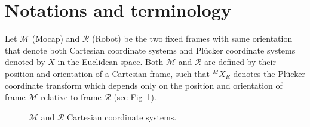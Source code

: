 \documentclass[a4paper, 12pt, oneside]{Thesis}  %
\begin{document}
\clearpage

\section{Notations and terminology}
Let $\mathcal{M}$ (Mocap) and $\mathcal{R}$ (Robot) be the two fixed frames with same orientation that denote both Cartesian coordinate systems and Pl\"ucker coordinate systems denoted by $X$ in the Euclidean space. Both $\mathcal{M}$ and $\mathcal{R}$ are defined by their position and orientation of a Cartesian frame, such that ${}^MX_R$ denotes the Pl\"ucker coordinate transform which depends only on the position and orientation of frame $\mathcal{M}$ relative to frame $\mathcal{R}$ (see Fig~\ref{fig:frames}).

\begin{figure}[ht]
	\caption{$\mathcal{M}$ and $\mathcal{R}$ Cartesian coordinate systems.}
	\label{fig:frames}
\end{figure}
\end{document}
